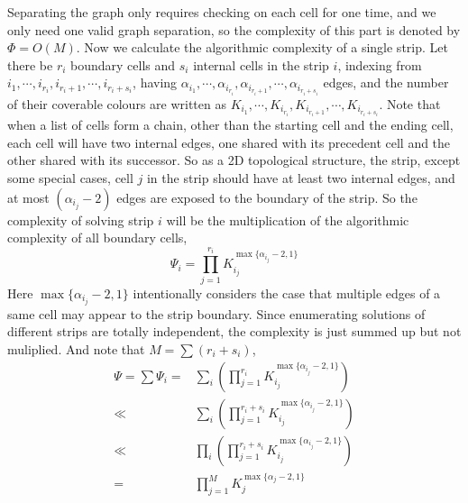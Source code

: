 \documentclass[conference]{IEEEtran}
\begin{document}
Separating the graph only requires checking on each cell for one time, and we only need one valid graph separation, so the complexity of this part is denoted by $\Phi = O(M)$. 
Now we calculate the algorithmic complexity of a single strip. Let there be $r_i$ boundary cells and $s_i$ internal cells in the strip $i$, indexing from $i_1, \cdots, i_{r_i}, i_{r_i+1}, \cdots, i_{r_i+s_i}$, having $\alpha_{i_1}, \cdots, \alpha_{i_{r_i}}, \alpha_{i_{r_i+1}}, \cdots, \alpha_{i_{r_i+s_i}}$ edges, and the number of their coverable colours are written as $K_{i_1}, \cdots, K_{i_{r_i}}, K_{i_{r_i+1}}, \cdots, K_{i_{r_i+s_i}}$. 
Note that when a list of cells form a chain, other than the starting cell and the ending cell, each cell will have  two internal edges, one shared with its precedent cell and the other shared with its successor. So as a 2D topological structure, the strip, except some special cases, cell $j$ in the strip should have at least two internal edges, and at most $(\alpha_{i_j}-2)$ edges are exposed to the boundary of the strip. 
So the complexity of solving strip $i$ will be the multiplication of the algorithmic complexity of all boundary cells, 
\begin{equation}
\Psi_i = \prod\limits_{j = 1}^{r_i} K_{i_j}^{\max\{\alpha_{i_j}-2, 1\}}
\end{equation}
Here $\max\{\alpha_{i_j}-2, 1\}$ intentionally considers the case that multiple edges of a same cell may appear to the strip boundary. 
Since enumerating solutions of different strips are totally independent, the complexity is just summed up but not muliplied. And note that $M = \sum (r_i+s_i)$, 
\begin{equation}
\begin{aligned}
\Psi = \sum \Psi_i = & \sum\limits_{i} \left(\prod\limits_{j = 1}^{r_i} K_{i_j}^{\max\{\alpha_{i_j}-2, 1\}}\right)\\
\ll & \sum\limits_{i} \left(\prod\limits_{j = 1}^{r_i+s_i} K_{i_j}^{\max\{\alpha_{i_j}-2, 1\}}\right)\\
\ll&\prod\limits_{i}\left(\prod\limits_{j = 1}^{r_i+s_i} K_{i_j}^{\max\{\alpha_{i_j}-2, 1\}}\right)\\
=&\prod\limits_{j = 1}^M K_j^{\max\{\alpha_j -2, 1\}}
\end{aligned}
\end{equation}
\end{document}
